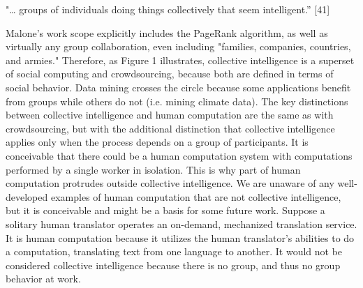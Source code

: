 \documentclass{acm_proc_article-sp} %
\begin{document}
"… groups of individuals doing things collectively that seem intelligent.” [41] 

Malone’s work scope explicitly includes the PageRank algorithm, as well as virtually any group collaboration, even including "families, companies, countries, and armies."  Therefore, as Figure 1 illustrates, collective intelligence is a superset of social computing and crowdsourcing, because both are defined in terms of social behavior. Data mining crosses the circle because some applications benefit from groups while others do not (i.e. mining climate data). The key distinctions between collective intelligence and human computation are the same as with crowdsourcing, but with the additional distinction that collective intelligence applies only when the process depends on a group of participants.  It is conceivable that there could be a human computation system with computations performed by a single worker in isolation. This is why part of human computation protrudes outside collective intelligence. We are unaware of any well-developed examples of human computation that are not collective intelligence, but it is conceivable and might be a basis for some future work.  Suppose a solitary human translator operates an on-demand, mechanized translation service.  It is human computation because it utilizes the human translator’s abilities to do a computation, translating text from one language to another.  It would not be considered collective intelligence because there is no group, and thus no group behavior at work. 
\end{document}
